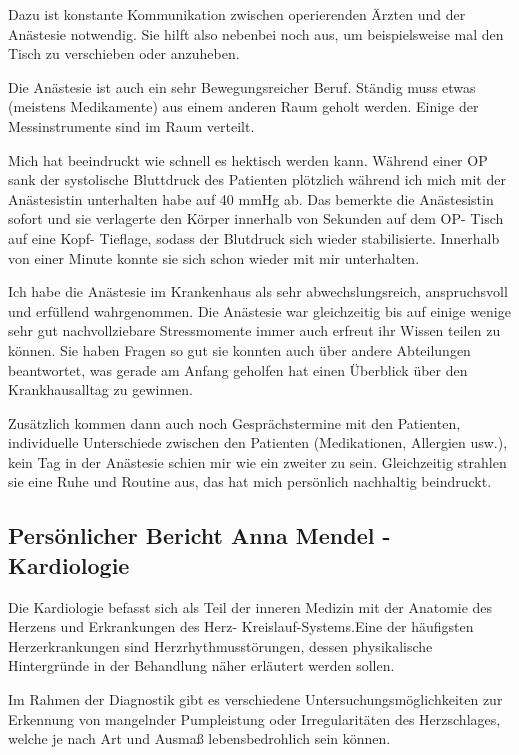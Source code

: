 \documentclass[11pt,a4paper,titlepage]{scrartcl}
\begin{document}
Dazu ist konstante Kommunikation zwischen operierenden Ärzten und der Anästesie notwendig. Sie hilft also nebenbei noch aus, um beispielsweise mal den Tisch zu verschieben oder anzuheben. \medskip

Die Anästesie ist auch ein sehr Bewegungsreicher Beruf. Ständig muss etwas (meistens Medikamente) aus einem anderen Raum geholt werden. Einige der Messinstrumente sind im Raum verteilt. \medskip

Mich hat beeindruckt wie schnell es hektisch werden kann. Während einer OP sank der systolische Bluttdruck des Patienten plötzlich während ich mich mit der Anästesistin unterhalten habe auf 40 mmHg ab. Das bemerkte die Anästesistin sofort und sie verlagerte den Körper innerhalb von Sekunden auf dem OP- Tisch auf eine Kopf- Tieflage, sodass der Blutdruck sich wieder stabilisierte. Innerhalb von einer Minute konnte sie sich schon wieder mit mir unterhalten. \medskip

Ich habe die Anästesie im Krankenhaus als sehr abwechslungsreich, anspruchsvoll und erfüllend wahrgenommen. Die Anästesie war gleichzeitig bis auf einige wenige sehr gut nachvollziebare Stressmomente immer auch erfreut ihr Wissen teilen zu können. Sie haben Fragen so gut sie konnten auch über andere Abteilungen beantwortet, was gerade am Anfang geholfen hat einen Überblick über den Krankhausalltag zu gewinnen. \medskip

Zusätzlich kommen dann auch noch Gesprächstermine mit den Patienten, individuelle Unterschiede zwischen den Patienten (Medikationen, Allergien usw.), kein Tag in der Anästesie schien mir wie ein zweiter zu sein. Gleichzeitig strahlen sie eine Ruhe und Routine aus, das hat mich persönlich nachhaltig beindruckt.






 

\newpage


\subsection{Persönlicher Bericht Anna Mendel - Kardiologie}

Die Kardiologie befasst sich als Teil der inneren Medizin mit der Anatomie des Herzens und Erkrankungen des Herz-
Kreislauf-Systems.Eine der häufigsten Herzerkrankungen sind Herzrhythmusstörungen, dessen physikalische Hintergründe in der Behandlung näher erläutert werden sollen.\medskip
    
Im Rahmen der Diagnostik gibt es verschiedene Untersuchungsmöglichkeiten zur Erkennung von mangelnder Pumpleistung oder Irregularitäten des Herzschlages, welche je nach Art und Ausmaß lebensbedrohlich sein können. \medskip
    
\end{document}
